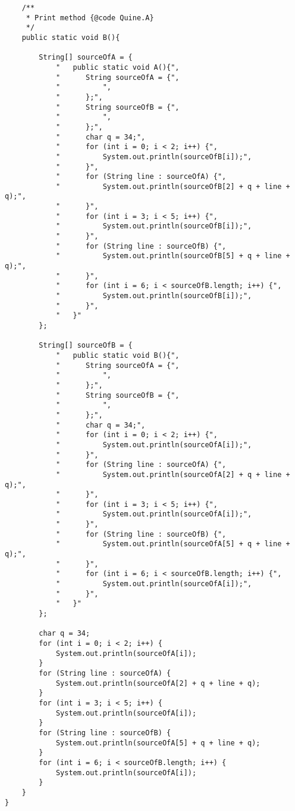 \documentclass[letterpaper]{article}
\begin{document}
\begin{verbatim}
    /**
     * Print method {@code Quine.A}
     */
    public static void B(){

        String[] sourceOfA = {
            "   public static void A(){",
            "      String sourceOfA = {",
            "          ",
            "      };",
            "      String sourceOfB = {",
            "          ",
            "      };",
            "      char q = 34;",
            "      for (int i = 0; i < 2; i++) {",
            "          System.out.println(sourceOfB[i]);",
            "      }",
            "      for (String line : sourceOfA) {",
            "          System.out.println(sourceOfB[2] + q + line + q);",
            "      }",
            "      for (int i = 3; i < 5; i++) {",
            "          System.out.println(sourceOfB[i]);",
            "      }",
            "      for (String line : sourceOfB) {",
            "          System.out.println(sourceOfB[5] + q + line + q);",
            "      }",
            "      for (int i = 6; i < sourceOfB.length; i++) {",
            "          System.out.println(sourceOfB[i]);",
            "      }",
            "   }"
        };

        String[] sourceOfB = {
            "   public static void B(){",
            "      String sourceOfA = {",
            "          ",
            "      };",
            "      String sourceOfB = {",
            "          ",
            "      };",
            "      char q = 34;",
            "      for (int i = 0; i < 2; i++) {",
            "          System.out.println(sourceOfA[i]);",
            "      }",
            "      for (String line : sourceOfA) {",
            "          System.out.println(sourceOfA[2] + q + line + q);",
            "      }",
            "      for (int i = 3; i < 5; i++) {",
            "          System.out.println(sourceOfA[i]);",
            "      }",
            "      for (String line : sourceOfB) {",
            "          System.out.println(sourceOfA[5] + q + line + q);",
            "      }",
            "      for (int i = 6; i < sourceOfB.length; i++) {",
            "          System.out.println(sourceOfA[i]);",
            "      }",
            "   }"
        };
        
        char q = 34;
        for (int i = 0; i < 2; i++) {
            System.out.println(sourceOfA[i]);
        }
        for (String line : sourceOfA) {
            System.out.println(sourceOfA[2] + q + line + q);
        }
        for (int i = 3; i < 5; i++) {
            System.out.println(sourceOfA[i]);
        }
        for (String line : sourceOfB) {
            System.out.println(sourceOfA[5] + q + line + q);
        }
        for (int i = 6; i < sourceOfB.length; i++) {
            System.out.println(sourceOfA[i]);
        }
    }
}
\end{verbatim}
\end{document}
